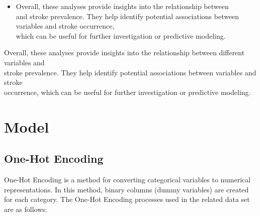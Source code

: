 \documentclass{article}
\begin{document}
\begin{titlepage}
\begin{itemize}
\item Overall, these analyses provide insights into the relationship between \\ and stroke prevalence. They help identify potential associations between variables and stroke occurrence,\\ which can be useful for further investigation or predictive modeling.

\end{itemize}

Overall, these analyses provide insights into the relationship between different variables and\\ stroke prevalence. They help identify potential associations between variables and stroke\\ occurrence, which can be useful for further investigation or predictive modeling.\\

\section{Model}

\subsection{One-Hot Encoding}

One-Hot Encoding is a method for converting categorical variables to numerical representations. In this method, binary columns (dummy variables) are created for each category. The One-Hot Encoding processes used in the related data set are as follows:

\end{titlepage}
\end{document}
